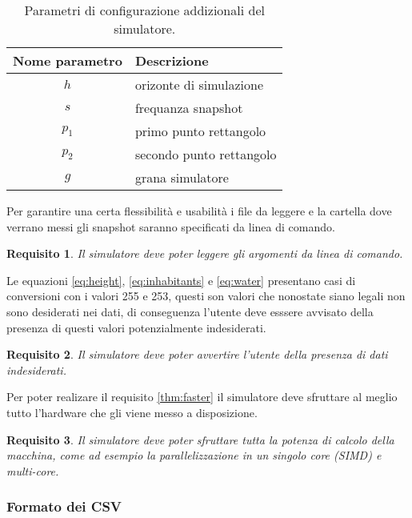 \documentclass[draft]{article}
\newcommand{\eng}[1]{\foreignlanguage{english}{#1}} %
\newtheorem{requirement}{Requisito}
\begin{document}
\begin{table}
\centering
\begin{tabular}{|c|l|}
	\hline
	\textbf{Nome parametro} & \textbf{Descrizione}\\
	\hline
	$h$ & orizonte di simulazione\\
	$s$ & frequanza \eng{snapshot}\\
	$p_1$ & primo punto rettangolo\\
	$p_2$ & secondo punto rettangolo\\
	$g$ & grana simulatore\\
	\hline
\end{tabular}
\caption{Parametri di configurazione addizionali del simulatore.}
\label{tab:config}
\end{table}

Per garantire una certa flessibilità e usabilità i file da leggere e la cartella
dove verrano messi gli \eng{snapshot} saranno specificati da linea di comando.

\begin{requirement}
Il simulatore deve poter leggere gli argomenti da linea di comando.
\end{requirement}

Le equazioni \ref{eq:height}, \ref{eq:inhabitants} e \ref{eq:water} presentano
casi di conversioni con i valori 255 e 253, questi son valori che nonostate
siano legali non sono desiderati nei dati, di conseguenza l'utente deve esssere
avvisato della presenza di questi valori potenzialmente indesiderati.

\begin{requirement}
Il simulatore deve poter avvertire l'utente della presenza di dati indesiderati.
\end{requirement}

Per poter realizare il requisito \ref{thm:faster} il simulatore deve sfruttare
al meglio tutto l'\eng{hardware} che gli viene messo a disposizione.

\begin{requirement}
Il simulatore deve poter sfruttare tutta la potenza di calcolo della macchina,
come ad esempio la parallelizzazione in un singolo \eng{core} (SIMD) e
\eng{multi-core}.
\end{requirement}

\iffalse
\subsubsection{Formato dei CSV}
\end{document}
